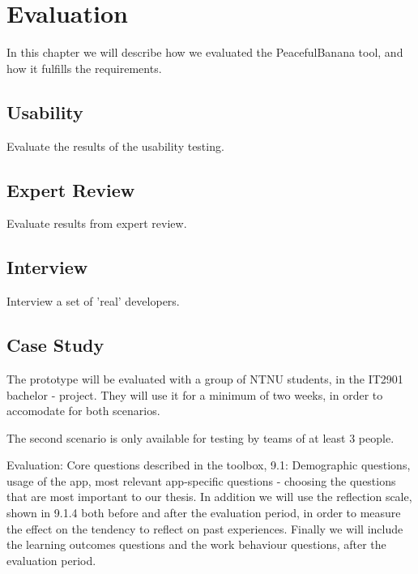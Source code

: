 \chapter{Evaluation}
In this chapter we will describe how we evaluated the PeacefulBanana tool, and how it fulfills the requirements.



\section{Usability}
Evaluate the results of the usability testing. 

\section{Expert Review}
Evaluate results from expert review. %

\section{Interview}
Interview a set of 'real' developers.

\section{Case Study}
The prototype will be evaluated with a group of NTNU students, in the IT2901 bachelor - project. They will use it for a minimum of two weeks, in order to accomodate for both scenarios.

The second scenario is only available for testing by teams of at least 3 people.

Evaluation:
Core questions described in the toolbox, 9.1:
Demographic questions, usage of the app, most relevant app-specific questions - choosing the questions that are most important to our thesis. 
In addition we will use the reflection scale, shown in 9.1.4 both before and after the evaluation period, in order to measure the effect on the tendency to reflect on past
experiences. Finally we will include the learning outcomes questions and the work behaviour questions, after the evaluation period. 

